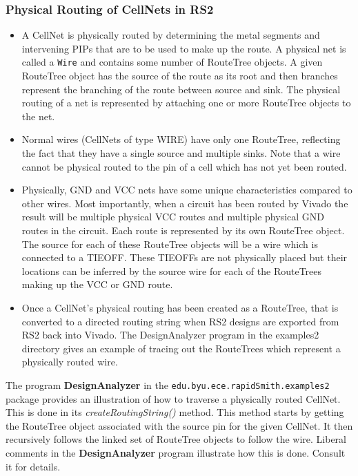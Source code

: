 \documentclass[12pt]{article}
\newcommand{\cls}[1]{{\texttt{#1}}}
\newcommand{\pkg}[1]{{\texttt{#1}}}
\newcommand{\pgm}[1]{{\textbf{#1}}}
\newcommand{\sbr}[1]{{\em #1}}
\begin{document}
\subsubsection{Physical Routing of CellNets in RS2}
\begin{itemize}
  \item A CellNet is physically routed by determining the metal segments and
  intervening PIPs that are to be used to make up the route.  A physical net is
  called a \cls{Wire} and contains some number of RouteTree objects.  A given
  RouteTree object has the source of the route as its root and then branches
  represent the branching of the route between source and sink. The physical
  routing of a net is represented by attaching one or more RouteTree objects to
  the net.
  \item Normal wires (CellNets of type WIRE) have only one RouteTree, reflecting
  the fact that they have a single source and multiple sinks.  Note that a wire
  cannot be physical routed to the pin of a cell which has not yet been routed.
  \item Physically, GND and VCC nets have some unique characteristics compared
  to other wires.  Most importantly, when a circuit has been routed by Vivado
  the result will be multiple physical VCC routes and multiple physical GND
  routes in the circuit.  Each route is represented by its own RouteTree object.
  The source for each of these RouteTree objects will be a wire which is
  connected to a TIEOFF.  These TIEOFFs are not physically placed but their
  locations can be inferred by the source wire for each of the RouteTrees making
  up the VCC or GND route.
  \item Once a CellNet’s physical routing has been created as a RouteTree, that
  is converted to a directed routing string when RS2 designs are exported from
  RS2 back into Vivado.  The DesignAnalyzer program in the examples2 directory
  gives an example of tracing out the RouteTrees which represent a physically
  routed wire.                       
\end{itemize}
The program \pgm{DesignAnalyzer} in the \pkg{edu.byu.ece.rapidSmith.examples2}
package provides an illustration of how to traverse a physically routed CellNet.  This
is done in its \sbr{createRoutingString()} method.  This method starts by
getting the RouteTree object associated with the source pin for the given CellNet.  It then
recursively follows the linked set of RouteTree objects to follow the wire. 
Liberal comments in the \pgm{DesignAnalyzer} program illustrate how this is
done.
Consult it for details.
\end{document}
